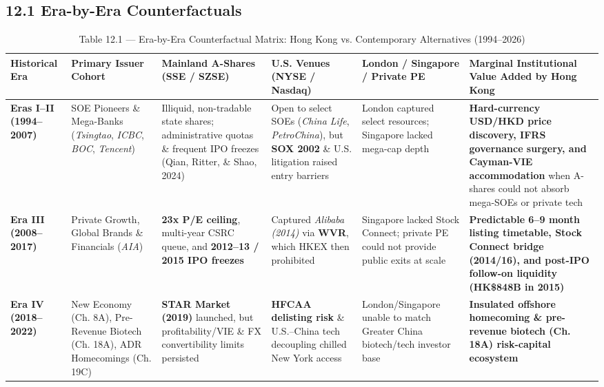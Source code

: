 \documentclass[11pt,letterpaper]{article}
\begin{document}
\subsection*{\texorpdfstring{12.1 Era-by-Era Counterfactuals}{12.1 Era-by-Era Counterfactuals}}
\begin{table}[!htbp]
\centering
\caption*{Table 12.1 — Era-by-Era Counterfactual Matrix: Hong Kong vs. Contemporary Alternatives (1994–2026)}
\begin{adjustbox}{max width=\textwidth,max totalheight=0.79\textheight}
\begin{minipage}{\textwidth}\centering
\footnotesize
\setlength{\tabcolsep}{3.5pt}
\renewcommand{\arraystretch}{1.18}
\begin{adjustbox}{max width=\textwidth}
\begin{tabular}{l>{\raggedright\arraybackslash}p{2.90cm}>{\raggedright\arraybackslash}p{2.90cm}>{\raggedright\arraybackslash}p{2.90cm}>{\raggedright\arraybackslash}p{2.90cm}>{\raggedright\arraybackslash}p{2.90cm}}
\toprule
Historical Era & Primary Issuer Cohort & Mainland A-Shares (SSE / SZSE) & U.S. Venues (NYSE / Nasdaq) & London / Singapore / Private PE & Marginal Institutional Value Added by Hong Kong \\
\midrule
\textbf{Eras I–II (1994–2007)} & SOE Pioneers \& Mega-Banks (\textit{Tsingtao}, \textit{ICBC}, \textit{BOC}, \textit{Tencent}) & Illiquid, non-tradable state shares; administrative quotas \& frequent IPO freezes (Qian, Ritter, \& Shao, 2024) & Open to select SOEs (\textit{China Life}, \textit{PetroChina}), but \textbf{SOX 2002} \& U.S. litigation raised entry barriers & London captured select resources; Singapore lacked mega-cap depth & \textbf{Hard-currency USD/HKD price discovery, IFRS governance surgery, and Cayman-VIE accommodation} when A-shares could not absorb mega-SOEs or private tech \\
\textbf{Era III (2008–2017)} & Private Growth, Global Brands \& Financials (\textit{AIA}) & \textbf{23x P/E ceiling}, multi-year CSRC queue, and \textbf{2012–13 / 2015 IPO freezes} & Captured \textit{Alibaba (2014)} via \textbf{WVR}, which HKEX then prohibited & Singapore lacked Stock Connect; private PE could not provide public exits at scale & \textbf{Predictable 6–9 month listing timetable, Stock Connect bridge (2014/16), and post-IPO follow-on liquidity (HK\$848B in 2015)} \\
\textbf{Era IV (2018–2022)} & New Economy (Ch. 8A), Pre-Revenue Biotech (Ch. 18A), ADR Homecomings (Ch. 19C) & \textbf{STAR Market (2019)} launched, but profitability/VIE \& FX convertibility limits persisted & \textbf{HFCAA delisting risk} \& U.S.–China tech decoupling chilled New York access & London/Singapore unable to match Greater China biotech/tech investor base & \textbf{Insulated offshore homecoming \& pre-revenue biotech (Ch. 18A) risk-capital ecosystem} \\

\end{tabular}
\end{adjustbox}
\end{minipage}
\end{adjustbox}
\end{table}
\end{document}
